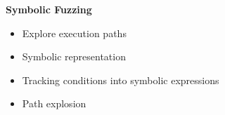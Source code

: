 \begin{frame}
	\begin{columns}[t]
		\begin{column}{0.4\textwidth}
			\textbf{Symbolic Fuzzing}
			\small
			\begin{itemize}
				\item Explore execution paths
				\item Symbolic representation
				\item Tracking conditions into symbolic expressions
				\item Path explosion
			\end{itemize}
		\end{column}
	\end{columns}
\end{frame}
